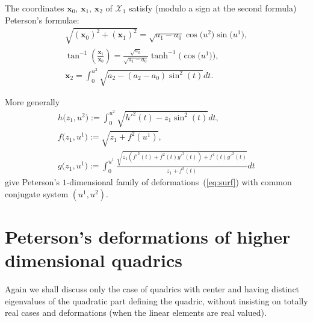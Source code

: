 The coordinates $\mathbf{x}_0$, $\mathbf{x}_1$, $\mathbf{x}_2$ of
$\mathcal{X}_1$ satisfy (modulo a sign at the second formula)
Peterson's formulae:
\begin{gather}
\sqrt{(\mathbf{x}_0)^2+(\mathbf{x}_1)^2}=\sqrt{a_1-a_0}\cos\big (u^2\big) \sin\big(u^1\big),\nonumber\\
\tan^{-1}\left(\frac{\mathbf{x}_1}{\mathbf{x}_0}\right)=
\frac{\sqrt{a_0}}{\sqrt{a_1-a_0}}\tanh^{-1}\big(\cos\big(u^1\big)\big),\nonumber\\
\mathbf{x}_2=\int_0^{u^2}\sqrt{a_2-(a_2-a_0)\sin^2(t)}dt.\label{eq:pf2}
\end{gather}

More generally
\begin{gather}
h\big(z_1,u^2\big):=\int_0^{u^2}\sqrt{h'^2(t)-z_1\sin^2(t)}dt,\nonumber\\
f\big(z_1,u^1\big):=\sqrt{z_1+f^2(u^1)},\nonumber\\
g\big(z_1,u^1\big):=\int_0^{u^1}\frac{\sqrt{z_1(f'^2(t)+f^2(t)g'^2(t))+f^4(t)g'^2(t)}}
{z_1+f^2(t)}dt\label{eq:bla}
\end{gather}
give Peterson's $1$-dimensional family of deformations~(\ref{eq:surf}) with common conjugate system $(u^1,u^2)$.


\section{Peterson's deformations of higher dimensional quadrics}\label{sec:pet1}

Again we shall discuss only the case of quadrics with center and
having distinct eigenvalues of the quadratic part def\/ining the
quadric, without insisting on totally real cases and deformations
(when the linear elements are real valued).

